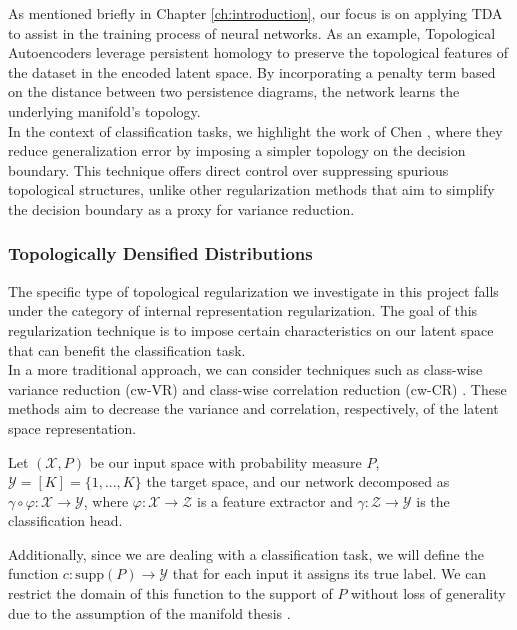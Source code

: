 \documentclass[../main.tex]{subfiles}
\begin{document}
As mentioned briefly in Chapter \ref{ch:introduction}, our focus is on applying TDA to assist in the training process of neural networks. As an example, Topological Autoencoders \cite{moor_topological_2021} leverage persistent homology to preserve the topological features of the dataset in the encoded latent space. By incorporating a penalty term based on the distance between two persistence diagrams, the network learns the underlying manifold's topology.\\

In the context of classification tasks, we highlight the work of Chen \etal \cite{chen_topological_2018}, where they reduce generalization error by imposing a simpler topology on the decision boundary. This technique offers direct control over suppressing spurious topological structures, unlike other regularization methods that aim to simplify the decision boundary as a proxy for variance reduction.

\subsubsection*{Topologically Densified Distributions}

The specific type of topological regularization we investigate in this project falls under the category of internal representation regularization. The goal of this regularization technique is to impose certain characteristics on our latent space that can benefit the classification task.\\

In a more traditional approach, we can consider techniques such as class-wise variance reduction (cw-VR) and class-wise correlation reduction (cw-CR) \cite{choi_utilizing_2019}. These methods aim to decrease the variance and correlation, respectively, of the latent space representation.\\

\begin{sloppypar}
Let $(\mathcal{X}, P)$ be our input space with probability measure $P$, ${\mathcal{Y} = [K] =\{1, ...,K\}}$ the target space, and our network decomposed as $\gamma \circ \varphi: \mathcal{X}  \to \mathcal{Y}$, where $\varphi: \mathcal{X}  \to \mathcal{Z}$ is a feature extractor and $\gamma: \mathcal{Z}  \to \mathcal{Y}$ is the classification head.    
\end{sloppypar}
Additionally, since we are dealing with a classification task, we will define the function $c: \text{supp}(P) \to \mathcal{Y}$ that for each input it assigns its true label. We can restrict the domain of this function to the support of $P$ without loss of generality due to the assumption of the manifold thesis \cite{fefferman_testing_2016}.\\
\end{document}
